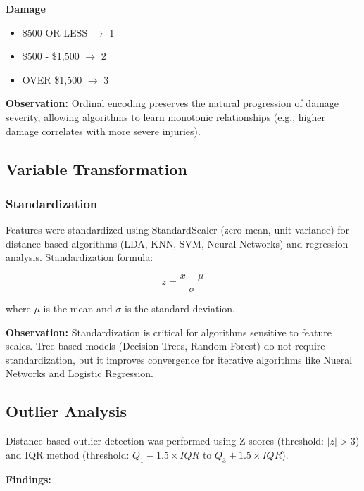 \documentclass[stu,12pt,floatsintext]{apa7}
\begin{document}
\textbf{Damage}
\begin{itemize}
    \item \$500 OR LESS $\rightarrow$ 1
    \item \$500 - \$1,500 $\rightarrow$ 2
    \item OVER \$1,500 $\rightarrow$ 3
\end{itemize}

\textbf{Observation:} Ordinal encoding preserves the natural progression of damage severity, allowing algorithms to learn monotonic 
relationships (e.g., higher damage correlates with more severe injuries).

\subsection{Variable Transformation}

\subsubsection{Standardization}

Features were standardized using StandardScaler (zero mean, unit variance) for distance-based algorithms (LDA, KNN, SVM, Neural Networks) and regression analysis. Standardization formula:

\begin{equation}
z = \frac{x - \mu}{\sigma}
\end{equation}

where $\mu$ is the mean and $\sigma$ is the standard deviation.

\textbf{Observation:} Standardization is critical for algorithms sensitive to feature scales. Tree-based models 
(Decision Trees, Random Forest) do not require standardization, but it improves convergence for iterative algorithms 
like Nueral Networks and Logistic Regression.

\subsection{Outlier Analysis}

Distance-based outlier detection was performed using Z-scores (threshold: $|z| > 3$) and IQR method (threshold: $Q_1 - 1.5 \times IQR$ to $Q_3 + 1.5 \times IQR$).

\textbf{Findings:}
\end{document}
